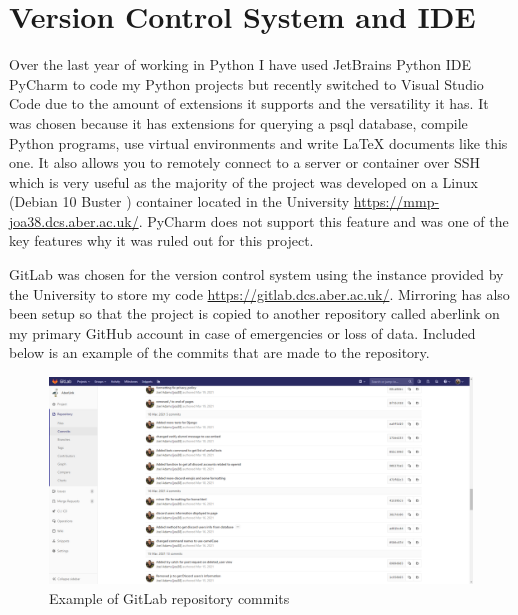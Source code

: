 \section{Version Control System and IDE}

Over the last year of working in Python I have used JetBrains Python IDE PyCharm \cite{pycharm} to code my Python projects but recently switched to Visual Studio Code \cite{vsc} due to the amount of extensions it supports and the versatility it has. It was chosen because it has extensions for querying a psql \cite{psql} database, compile Python programs, use virtual environments and write LaTeX documents like this one. It also allows you to remotely connect to a server or container over SSH which is very useful as the majority of the project was developed on a Linux (Debian 10 Buster \cite{debian}) container located in the University \href{https://mmp-joa38.dcs.aber.ac.uk/}{https://mmp-joa38.dcs.aber.ac.uk/}. PyCharm does not support this feature and was one of the key features why it was ruled out for this project.

GitLab was chosen for the version control system using the instance provided by the University to store my code \href{https://gitlab.dcs.aber.ac.uk/}{https://gitlab.dcs.aber.ac.uk/}. Mirroring has also been setup so that the project is copied to another repository called aberlink on my primary GitHub account in case of emergencies or loss of data. Included below is an example of the commits that are made to the repository.
\begin{figure}[H]
	\centering
	\includegraphics[width=1\textwidth]{Figures/gitlab.png}	
	\caption{Example of GitLab repository commits}
	\label{fig:gitlab}
\end{figure}
